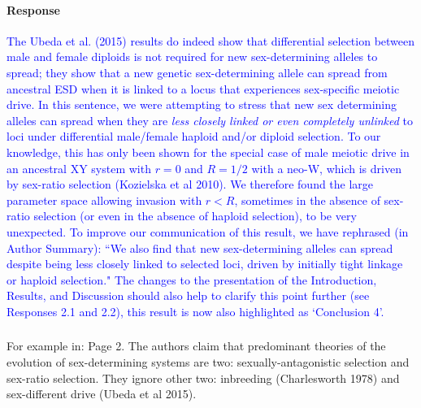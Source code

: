 \documentclass[10pt,letterpaper]{article}
\begin{document}
\noindent\paragraph{Response}
\textcolor{blue}{
The Ubeda et al. (2015) results do indeed show that differential selection between male and female diploids is not required for new sex-determining alleles to spread; they show that a new genetic sex-determining allele can spread from ancestral ESD when it is linked to a locus that experiences sex-specific meiotic drive. 
In this sentence, we were attempting to stress that new sex determining alleles can spread when they are \textit{less closely linked or even completely unlinked} to loci under differential male/female haploid and/or diploid selection. 
To our knowledge, this has only been shown for the special case of male meiotic drive in an ancestral XY system with $r=0$ and $R=1/2$ with a neo-W, which is driven by sex-ratio selection (Kozielska et al 2010). 
We therefore found the large parameter space allowing invasion with $r<R$, sometimes in the absence of sex-ratio selection (or even in the absence of haploid selection), to be very unexpected.
To improve our communication of this result, we have rephrased (in Author Summary): ``We also find that new sex-determining alleles can spread despite being less closely linked to selected loci, driven by initially tight linkage or haploid selection." 
The changes to the presentation of the Introduction, Results, and Discussion should also help to clarify this point further (see Responses 2.1 and 2.2), this result is now also highlighted as `Conclusion 4'. 
}

\noindent\subsubsection{}
For example in: Page 2. The authors claim that predominant theories of the evolution of sex-determining systems are two: sexually-antagonistic selection and sex-ratio selection. They ignore other two: inbreeding (Charlesworth 1978) and sex-different drive (Ubeda et al 2015). 
\end{document}
